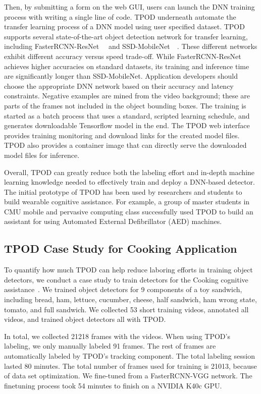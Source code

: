 Then, by submitting a form on the web GUI, users can launch the DNN training
process with writing a single line of code. TPOD underneath automate the
transfer learning process of a DNN model using user specified dataset. TPOD
supports several state-of-the-art object detection network for transfer
learning, including FasterRCNN-ResNet~\cite{ren2015faster}~\cite{He2016} and
SSD-MobileNet~\cite{Liu2016}~\cite{Howard2017}. These different networks exhibit
different accuracy versus speed trade-off. While FasterRCNN-ResNet achieves
higher accuracies on standard datasets, its training and inference time are
significantly longer than SSD-MobileNet. Application developers should choose
the appropriate DNN network based on their accuracy and latency constraints.
Negative examples are mined from the video background; these are parts of the
frames not included in the object bounding boxes.  The training is started as a
batch process that uses a standard, scripted learning schedule, and generates
downloadable Tensorflow model in the end. The TPOD web interface provides
training monitoring and download links for the created model files. TPOD also
provides a container image that can directly serve the downloaded model files
for inference.

Overall, TPOD can greatly reduce both the labeling effort and in-depth machine
learning knowledge needed to effectively train and deploy a DNN-based detector.
The initial prototype of TPOD has been used by researchers and students to build
wearable cognitive assistance. For example, a group of master students in CMU
mobile and pervasive computing class successfully used TPOD to build an
assistant for using Automated External Defibrillator (AED) machines.

\subsection{TPOD Case Study for Cooking Application}

To quantify how much TPOD can help reduce laboring efforts in training object
detectors, we conduct a case study to train detectors for the Cooking cognitive
assistance~\cite{chen2018application}. We trained object detectors for 9
components of a toy sandwich, including bread, ham, lettuce, cucumber, cheese,
half sandwich, ham wrong state, tomato, and full sandwich. We collected 53 short
training videos, annotated all videos, and trained object detectors all with
TPOD.

In total, we collected 21218 frames with the videos. When using TPOD's labeling,
we only manually labeled 91 frames. The rest of frames are automatically labeled
by TPOD's tracking component. The total labeling session lasted 80 minutes. The
total number of frames used for training is 21013, because of data set
optimization. We fine-tuned from a FasterRCNN-VGG network. The finetuning
process took 54 minutes to finish on a NVIDIA K40c GPU.


